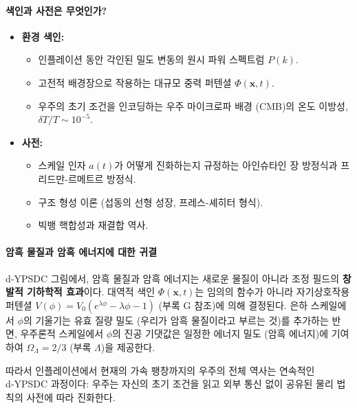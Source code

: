 \documentclass[11pt,a4paper]{article}
\begin{document}
\paragraph*{색인과 사전은 무엇인가?}
\begin{itemize}[leftmargin=*]
	\item \textbf{환경 색인:}
	\begin{itemize}
		\item 인플레이션 동안 각인된 밀도 변동의 원시 파워 스펙트럼 $P(k)$.
		\item 고전적 배경장으로 작용하는 대규모 중력 퍼텐셜 $\Phi(\mathbf{x},t)$.
		\item 우주의 초기 조건을 인코딩하는 우주 마이크로파 배경 (CMB)의 온도 이방성, $\delta T / T \sim 10^{-5}$.
	\end{itemize}
	\item \textbf{사전:}
	\begin{itemize}
		\item 스케일 인자 $a(t)$가 어떻게 진화하는지 규정하는 아인슈타인 장 방정식과 프리드만-르메트르 방정식.
		\item 구조 형성 이론 (섭동의 선형 성장, 프레스-셰히터 형식).
		\item 빅뱅 핵합성과 재결합 역사.
	\end{itemize}
\end{itemize}

\paragraph*{암흑 물질과 암흑 에너지에 대한 귀결}
d‑YPSDC 그림에서, 암흑 물질과 암흑 에너지는 새로운 물질이 아니라 조정 필드의 \textbf{창발적 기하학적 효과}이다. 대역적 색인 $\Phi(\mathbf{x},t)$는 임의의 함수가 아니라 자기상호작용 퍼텐셜 $V(\phi) = V_0 (e^{\lambda \phi} - \lambda \phi - 1)$ (부록 G 참조)에 의해 결정된다. 은하 스케일에서 $\phi$의 기울기는 유효 질량 밀도 (우리가 암흑 물질이라고 부르는 것)를 추가하는 반면, 우주론적 스케일에서 $\phi$의 진공 기댓값은 일정한 에너지 밀도 (암흑 에너지)에 기여하여 $\Omega_\Lambda = 2/3$ (부록 $\Lambda$)을 제공한다.

따라서 인플레이션에서 현재의 가속 팽창까지의 우주의 전체 역사는 연속적인 d‑YPSDC 과정이다: 우주는 자신의 초기 조건을 읽고 외부 통신 없이 공유된 물리 법칙의 사전에 따라 진화한다.
\end{document}
